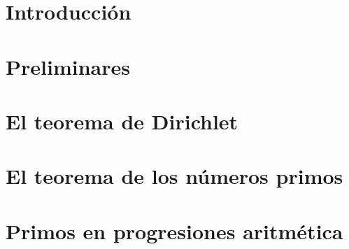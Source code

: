 \documentclass[12pt]{book}
\begin{document}

\setcounter{page}{1}
\chapter*{Introducción}

\blankpages
\chapter{Preliminares}

\blankpages
\chapter{El teorema de Dirichlet}

\blankpages
\chapter{El teorema de los números primos}

\blankpages
\chapter{Primos en progresiones aritmética}

\nocite{*}
\blankpages


\end{document}
